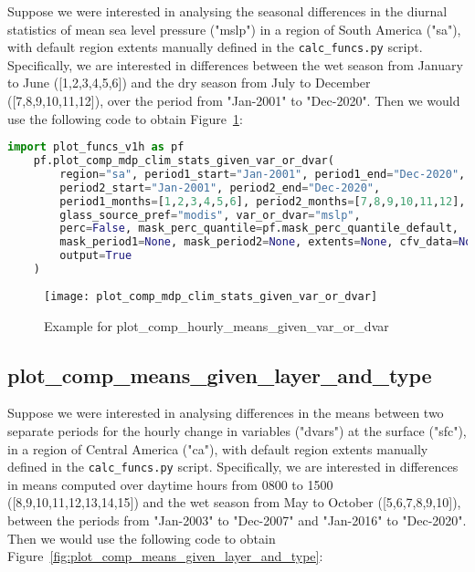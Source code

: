 Suppose we were interested in analysing the seasonal differences in the diurnal statistics of mean sea level pressure ("mslp") in a region of South America ("sa"), with default region extents manually defined in the \verb+calc_funcs.py+ script. Specifically, we are interested in differences between the wet season from January to June ([1,2,3,4,5,6]) and the dry season from July to December ([7,8,9,10,11,12]), over the period from "Jan-2001" to "Dec-2020". Then we would use the following code to obtain Figure~\ref{fig:plot_comp_mdp_clim_stats_given_var_or_dvar}:

\begin{lstlisting}[language=Python,caption={Example for plot\_comp\_mdp\_clim\_stats\_given\_var\_or\_dvar},captionpos=b]
	import plot_funcs_v1h as pf
	pf.plot_comp_mdp_clim_stats_given_var_or_dvar(
		region="sa", period1_start="Jan-2001", period1_end="Dec-2020", 
		period2_start="Jan-2001", period2_end="Dec-2020", 
		period1_months=[1,2,3,4,5,6], period2_months=[7,8,9,10,11,12], 
		glass_source_pref="modis", var_or_dvar="mslp", 
		perc=False, mask_perc_quantile=pf.mask_perc_quantile_default, 
		mask_period1=None, mask_period2=None, extents=None, cfv_data=None, 
		output=True
	)
\end{lstlisting}

\begin{figure}[!htp]
	\centering
	\texttt{[image: plot\_comp\_mdp\_clim\_stats\_given\_var\_or\_dvar]}
	\caption{Example for plot\_comp\_hourly\_means\_given\_var\_or\_dvar}
	\label{fig:plot_comp_mdp_clim_stats_given_var_or_dvar}
\end{figure}

\subsection{plot\_comp\_means\_given\_layer\_and\_type}

Suppose we were interested in analysing differences in the means between two separate periods for the hourly change in variables ("dvars") at the surface ("sfc"), in a region of Central America ("ca"), with default region extents manually defined in the \verb+calc_funcs.py+ script. Specifically, we are interested in differences in means computed over daytime hours from 0800 to 1500 ([8,9,10,11,12,13,14,15]) and the wet season from May to October ([5,6,7,8,9,10]), between the periods from "Jan-2003" to "Dec-2007" and "Jan-2016" to "Dec-2020". Then we would use the following code to obtain Figure~\ref{fig:plot_comp_means_given_layer_and_type}:

